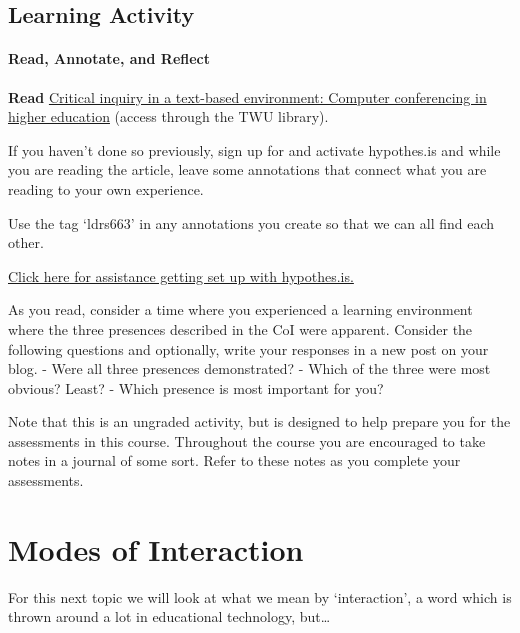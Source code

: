 \documentclass[
]{book}
\begin{document}
\hypertarget{learning-activity-1}{%
\subsection*{Learning Activity}\label{learning-activity-1}}

\begin{reflect}
\hypertarget{read-annotate-and-reflect}{%
\paragraph{Read, Annotate, and
Reflect}\label{read-annotate-and-reflect}}

\textbf{Read}
\href{https://www-sciencedirect-com.twu.idm.oclc.org/science/article/pii/S1096751600000166}{Critical
inquiry in a text-based environment: Computer conferencing in higher
education} (access through the TWU library).

If you haven't done so previously, sign up for and activate hypothes.is
and while you are reading the article, leave some annotations that
connect what you are reading to your own experience.

Use the tag `ldrs663' in any annotations you create so that we can all
find each other.

\href{http://create.twu.ca/help/other-web-tools/hypothesis}{Click here
for assistance getting set up with hypothes.is.}

As you read, consider a time where you experienced a learning
environment where the three presences described in the CoI were
apparent. Consider the following questions and optionally, write your
responses in a new post on your blog. - Were all three presences
demonstrated? - Which of the three were most obvious? Least? - Which
presence is most important for you?

Note that this is an ungraded activity, but is designed to help prepare
you for the assessments in this course. Throughout the course you are
encouraged to take notes in a journal of some sort. Refer to these notes
as you complete your assessments.
\end{reflect}

\hypertarget{modes-of-interaction}{%
\section{Modes of Interaction}\label{modes-of-interaction}}

For this next topic we will look at what we mean by `interaction', a word which is thrown around a lot in educational technology, but\ldots{}
\end{document}

